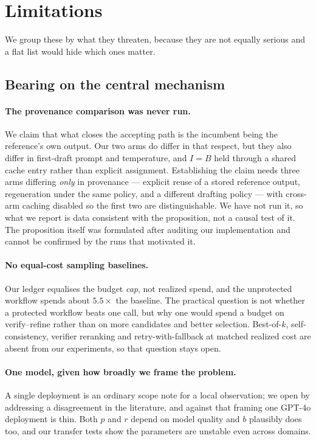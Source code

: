 \documentclass{article}
\newcommand{\rrate}{r}
\newcommand{\brate}{b}
\begin{document}
\section{Limitations}
\label{sec:limitations}

We group these by what they threaten, because they are not equally serious and
a flat list would hide which ones matter.

\subsection*{Bearing on the central mechanism}

\paragraph{The provenance comparison was never run.} We claim that what closes
the accepting path is the incumbent being the reference's own output. Our two
arms do differ in that respect, but they also differ in first-draft prompt and
temperature, and $I=B$ held through a shared cache entry rather than explicit
assignment. Establishing the claim needs three arms differing \emph{only} in
provenance --- explicit reuse of a stored reference output, regeneration under
the same policy, and a different drafting policy --- with cross-arm caching
disabled so the first two are distinguishable. We have not run it, so what we
report is data consistent with the proposition, not a causal test of it. The
proposition itself was formulated after auditing our implementation and cannot
be confirmed by the runs that motivated it.

\paragraph{No equal-cost sampling baselines.} Our ledger equalises the budget
\emph{cap}, not realized spend, and the unprotected workflow spends about
$5.5\times$ the baseline. The practical question is not whether a protected
workflow beats one call, but why one would spend a budget on verify--refine
rather than on more candidates and better selection. Best-of-$k$,
self-consistency, verifier reranking and retry-with-fallback at matched realized
cost are absent from our experiments, so that question stays open.

\paragraph{One model, given how broadly we frame the problem.} A single
deployment is an ordinary scope note for a local observation; we open by
addressing a disagreement in the literature, and against that framing one GPT-4o
deployment is thin. Both $p$ and $\rrate$ depend on model quality and $\brate$
plausibly does too, and our transfer tests show the parameters are unstable even
across domains.
\end{document}
